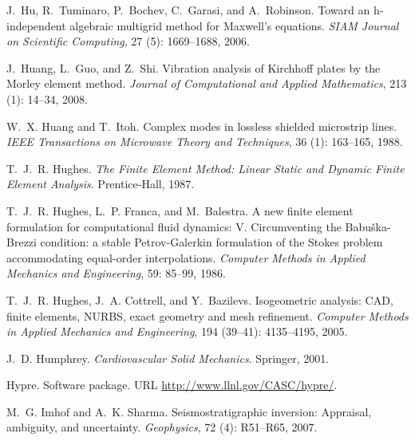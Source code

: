 \begin{thebibliography}{467}
J.~Hu, R.~Tuminaro, P.~Bochev, C.~Garasi, and A.~Robinson.
\newblock Toward an h-independent algebraic multigrid method for {M}axwell's
  equations.
\newblock \emph{SIAM Journal on Scientific Computing}, 27
  (5): 1669--1688, 2006.

J.~Huang, L.~Guo, and Z.~Shi.
\newblock Vibration analysis of {K}irchhoff plates by the {M}orley element
  method.
\newblock \emph{Journal of Computational and Applied Mathematics}, 213
  (1): 14--34, 2008.

W.~X. Huang and T.~Itoh.
\newblock Complex modes in lossless shielded microstrip lines.
\newblock \emph{IEEE Transactions on Microwave Theory and Techniques},
  36 (1): 163--165, 1988.

T.~J.~R. Hughes.
\newblock \emph{The Finite Element Method: Linear Static and Dynamic Finite
  Element Analysis}.
\newblock Prentice-Hall, 1987.

T.~J.~R. Hughes, L.~P. Franca, and M.~Balestra.
\newblock A new finite element formulation for computational fluid dynamics:
  {V}. {C}ircumventing the {B}abu\v{s}ka-{B}rezzi condition: a stable
  {P}etrov-{G}alerkin formulation of the {S}tokes problem accommodating
  equal-order interpolations.
\newblock \emph{Computer Methods in Applied Mechanics and Engineering},
  59: 85--99, 1986.

T.~J.~R. Hughes, J.~A. Cottrell, and Y.~Bazilevs.
\newblock Isogeometric analysis: {CAD}, finite elements, {NURBS}, exact
  geometry and mesh refinement.
\newblock \emph{Computer Methods in Applied Mechanics and Engineering},
  194 (39--41): 4135--4195, 2005.

J.~D. Humphrey.
\newblock \emph{Cardiovascular Solid Mechanics}.
\newblock Springer, 2001.

Hypre.
\newblock Software package.
\newblock URL \url{http://www.llnl.gov/CASC/hypre/}.

M.~G. Imhof and A.~K. Sharma.
\newblock Seismostratigraphic inversion: Appraisal, ambiguity, and uncertainty.
\newblock \emph{Geophysics}, 72 (4): R51--R65, 2007.


\end{thebibliography}
